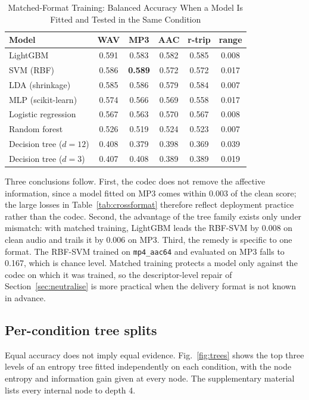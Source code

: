\documentclass[lettersize,journal]{IEEEtran}
\newcommand{\ttf}[1]{\texttt{\footnotesize #1}}
\begin{document}
\begin{table}[!t]
\caption{Matched-Format Training: Balanced Accuracy When a Model Is Fitted and Tested in the Same Condition}
\label{tab:matched}
\centering
\scriptsize
\setlength{\tabcolsep}{3.5pt}
\begin{tabular}{@{}lccccc@{}}
\toprule
Model & WAV & MP3 & AAC & r-trip & range\\
\midrule
LightGBM               & 0.591 & 0.583 & 0.582 & 0.585 & 0.008\\
SVM (RBF)              & 0.586 & \textbf{0.589} & 0.572 & 0.572 & 0.017\\
LDA (shrinkage)        & 0.585 & 0.586 & 0.579 & 0.584 & 0.007\\
MLP (scikit-learn)     & 0.574 & 0.566 & 0.569 & 0.558 & 0.017\\
Logistic regression    & 0.567 & 0.563 & 0.570 & 0.567 & 0.008\\
Random forest          & 0.526 & 0.519 & 0.524 & 0.523 & 0.007\\
Decision tree ($d=12$) & 0.408 & 0.379 & 0.398 & 0.369 & 0.039\\
Decision tree ($d=3$)  & 0.407 & 0.408 & 0.389 & 0.389 & 0.019\\
\bottomrule
\end{tabular}
\end{table}

Three conclusions follow. First, the codec does not remove the affective
information, since a model fitted on MP3 comes within 0.003 of the clean score;
the large losses in Table~\ref{tab:crossformat} therefore reflect deployment
practice rather than the codec. Second, the advantage of the tree family exists
only under mismatch: with matched training, LightGBM leads the RBF-SVM by 0.008
on clean audio and trails it by 0.006 on MP3. Third, the remedy is specific to
one format. The RBF-SVM trained on \ttf{mp4\_aac64} and evaluated on MP3 falls
to 0.167, which is chance level. Matched training protects a model only against
the codec on which it was trained, so the descriptor-level repair of
Section~\ref{sec:neutralise} is more practical when the delivery format is not
known in advance.

\subsection{Per-condition tree splits}\label{sec:trees}
Equal accuracy does not imply equal evidence. Fig.~\ref{fig:trees} shows the
top three levels of an entropy tree fitted independently on each condition,
with the node entropy and information gain given at every node. The
supplementary material lists every internal node to depth 4.
\end{document}
